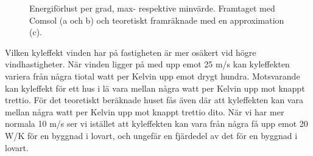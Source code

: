 \begin{figure}[hpbt]
\centering
{}
\vspace{5mm}


\caption{\label{fig:windenergyloss}Energiförlust per grad, max- respektive minvärde.
Framtaget med Comsol (a och b) och teoretiskt framräknade med en approximation (c).}
\end{figure}

Vilken kyleffekt vinden har på fastigheten är mer osäkert vid högre vindhastigheter. När vinden
 ligger på med upp emot 25 m/s kan kyleffekten variera från några tiotal watt per Kelvin upp 
 emot drygt hundra. Motsvarande kan kyleffekt för ett hus i lä vara mellan några watt per 
 Kelvin upp mot knappt trettio. För det teoretiskt beräknade huset fås även där att kyleffekten 
 kan vara mellan några watt per Kelvin upp mot knappt trettio dito. När vi har mer normala 10 
 m/s ser vi istället att kyleffekten kan vara från några få upp emot 20 W/K för en byggnad i 
 lovart, och ungefär en fjärdedel av det för en byggnad i lovart.
